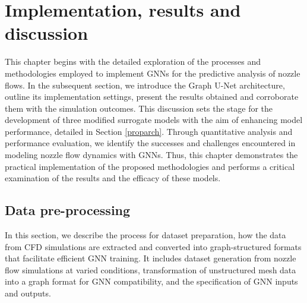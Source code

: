 \chapter{Implementation, results and discussion}
\label{chap:Method}
This chapter begins with the detailed exploration of the processes and methodologies employed to implement GNNs for the predictive analysis of nozzle flows. In the subsequent section, we introduce the Graph U-Net architecture, outline its implementation settings, present the results obtained and corroborate them with the simulation outcomes. This discussion sets the stage for the development of three modified surrogate models with the aim of enhancing model performance, detailed in Section \ref{proparch}. Through quantitative analysis and performance evaluation, we identify the successes and challenges encountered in modeling nozzle flow dynamics with GNNs. Thus, this chapter demonstrates the practical implementation of the proposed methodologies and performs a critical examination of the results and the efficacy of these models.
\section{Data pre-processing} \label{prep}
In this section, we describe the process for dataset preparation, how the data from CFD simulations are extracted and converted into graph-structured formats that facilitate efficient GNN training. It includes dataset generation from nozzle flow simulations at varied conditions, transformation of unstructured mesh data into a graph format for GNN compatibility, and the specification of GNN inputs and outputs. 
